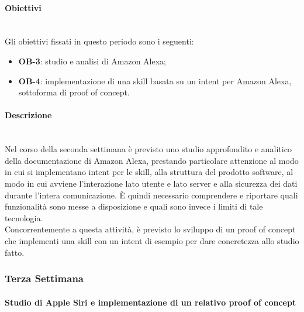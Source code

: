 {    	\paragraph*{Obiettivi} \mbox{}\\ [1mm]
    	Gli obiettivi fissati in questo periodo sono i seguenti:
    	\begin{itemize}
    		\item \textbf{OB-3}: studio e analisi di Amazon Alexa;
    		\item \textbf{OB-4}: implementazione di una skill basata su un intent per Amazon Alexa, sottoforma di proof of concept.
    	\end{itemize}
        \paragraph*{Descrizione} \mbox{}\\ [1mm]
    	Nel corso della seconda settimana è previsto uno studio approfondito e analitico della documentazione di Amazon Alexa, prestando particolare attenzione al modo in cui si implementano intent per le skill, alla struttura del prodotto software, al modo in cui avviene l'interazione lato utente e lato server e alla sicurezza dei dati durante l'intera comunicazione. È quindi necessario comprendere e riportare quali funzionalità sono messe a disposizione e quali sono invece i limiti di tale tecnologia. \\
    	Concorrentemente a questa attività, è previsto lo sviluppo di un proof of concept che implementi una skill con un intent di esempio per dare concretezza allo studio fatto.
	\subsubsection{Terza Settimana}
		\paragraph{Studio di Apple Siri e implementazione di un relativo proof of concept}
}
